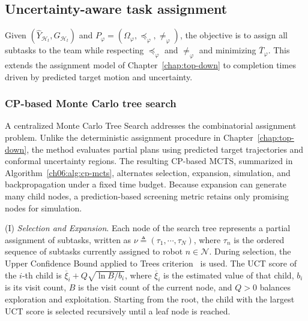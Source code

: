 \subsection{Uncertainty-aware task assignment}
\label{ch06:subsec:assignment}

Given $(\widehat{Y}_{\mathcal{H}_t},G_{\mathcal{H}_t})$ and
$P_{\varphi}=(\Omega_{\varphi},\preceq_{\varphi},\neq_{\varphi})$, the
objective is to assign all subtasks to the team while respecting
$\preceq_{\varphi}$ and $\neq_{\varphi}$ and minimizing
$\overline{T}_{\varphi}$. This extends the assignment model of
Chapter~\ref{chap:top-down} to completion times driven by predicted target
motion and uncertainty.

\subsubsection{CP-based Monte Carlo tree search}
\label{ch06:sec:cp-mcts}

A centralized Monte Carlo Tree Search addresses the combinatorial assignment
problem. Unlike the deterministic assignment procedure in
Chapter~\ref{chap:top-down}, the method evaluates partial plans using predicted
target trajectories and conformal uncertainty regions. The resulting CP-based
MCTS, summarized in Algorithm~\ref{ch06:alg:cp-mcts}, alternates selection,
expansion, simulation, and backpropagation under a fixed time budget. Because
expansion can generate many child nodes, a prediction-based screening metric
retains only promising nodes for simulation.

(I) \emph{Selection and Expansion}.
Each node of the search tree represents a partial assignment of
subtasks, written as
$\nu \triangleq (\tau_1,\cdots,\tau_N)$, where $\tau_n$ is the ordered
sequence of subtasks currently assigned to robot $n \in \mathcal{N}$.
During selection, the Upper Confidence Bound applied to Trees
criterion~\citep{2006Bandit} is used. The UCT score of the $i$-th child
is
$\overline{\xi}_i + Q\sqrt{\ln B/b_i}$, where $\overline{\xi}_i$ is the
estimated value of that child, $b_i$ is its visit count, $B$ is the
visit count of the current node, and $Q > 0$ balances exploration and
exploitation. Starting from the root, the child with the largest UCT
score is selected recursively until a leaf node is reached.

